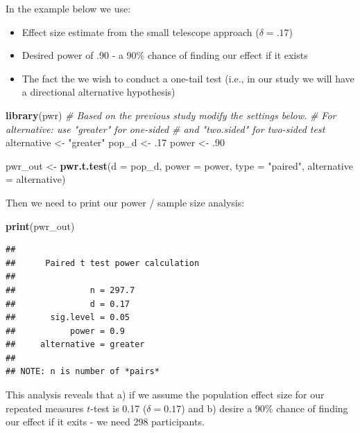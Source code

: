 \documentclass[
]{krantz}
\makeatletter
\newenvironment{Shaded}{\begin{snugshade}}{\end{snugshade}}
\newcommand{\CommentTok}[1]{\textcolor[rgb]{0.37,0.37,0.37}{\textit{#1}}}
\newcommand{\DataTypeTok}[1]{\textcolor[rgb]{0.27,0.27,0.27}{#1}}
\newcommand{\FloatTok}[1]{\textcolor[rgb]{0.06,0.06,0.06}{#1}}
\newcommand{\KeywordTok}[1]{\textcolor[rgb]{0.27,0.27,0.27}{\textbf{#1}}}
\newcommand{\NormalTok}[1]{#1}
\newcommand{\StringTok}[1]{\textcolor[rgb]{0.5,0.5,0.5}{#1}}
\newenvironment{kframe}{%
\medskip{}
\setlength{\fboxsep}{.8em}
 \def\at@end@of@kframe{}%
 \ifinner\ifhmode%
  \def\at@end@of@kframe{\end{minipage}}%
  \begin{minipage}{\columnwidth}%
 \fi\fi%
 \def\FrameCommand##1{\hskip\@totalleftmargin \hskip-\fboxsep
 \colorbox{shadecolor}{##1}\hskip-\fboxsep
     \hskip-\linewidth \hskip-\@totalleftmargin \hskip\columnwidth}%
 \MakeFramed {\advance\hsize-\width
   \@totalleftmargin\z@ \linewidth\hsize
   \@setminipage}}%
 {\par\unskip\endMakeFramed%
 \at@end@of@kframe}
\renewenvironment{Shaded}{\begin{kframe}}{\end{kframe}}
\makeatother
\begin{document}
In the example below we use:

\begin{itemize}
\item
  Effect size estimate from the small telescope approach (\(\delta = .17\))
\item
  Desired power of .90 - a 90\% chance of finding our effect if it exists
\item
  The fact the we wish to conduct a one-tail test (i.e., in our study we will have a directional alternative hypothesis)
\end{itemize}

\begin{Shaded}
\begin{Highlighting}[]
\KeywordTok{library}\NormalTok{(pwr)}
\CommentTok{# Based on the previous study modify the settings below.}
\CommentTok{# For alternative: use "greater" for one-sided }
\CommentTok{# and "two.sided" for two-sided test}
\NormalTok{alternative <-}\StringTok{ "greater"}
\NormalTok{pop_d <-}\StringTok{ }\FloatTok{.17}
\NormalTok{power <-}\StringTok{ }\FloatTok{.90}

\NormalTok{pwr_out <-}\StringTok{ }\KeywordTok{pwr.t.test}\NormalTok{(}\DataTypeTok{d =}\NormalTok{ pop_d, }
                      \DataTypeTok{power =}\NormalTok{ power,}
                      \DataTypeTok{type =} \StringTok{"paired"}\NormalTok{,}
                      \DataTypeTok{alternative =}\NormalTok{ alternative)}
\end{Highlighting}
\end{Shaded}

Then we need to print our power / sample size analysis:

\begin{Shaded}
\begin{Highlighting}[]
\KeywordTok{print}\NormalTok{(pwr_out)}
\end{Highlighting}
\end{Shaded}

\begin{verbatim}
## 
##      Paired t test power calculation 
## 
##               n = 297.7
##               d = 0.17
##       sig.level = 0.05
##           power = 0.9
##     alternative = greater
## 
## NOTE: n is number of *pairs*
\end{verbatim}

This analysis reveals that a) if we assume the population effect size for our repeated measures \(t\)-test is 0.17 (\(\delta = 0.17\)) and b) desire a 90\% chance of finding our effect if it exits - we need 298 participants.
\end{document}
